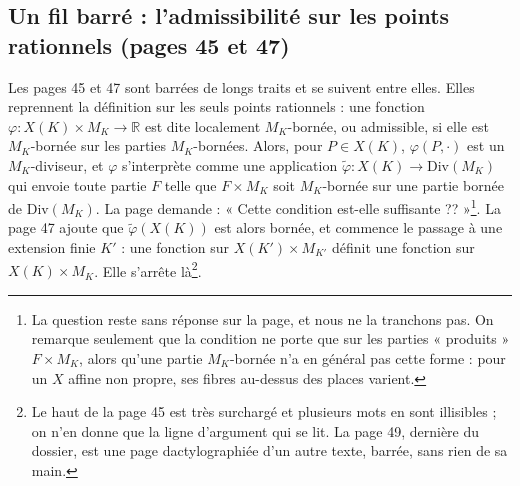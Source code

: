 \documentclass[11pt,a4paper]{article}
\begin{document}
\subsection*{Un fil barré : l'admissibilité sur les points rationnels (pages 45 et 47)}

Les pages 45 et 47 sont barrées de longs traits et se suivent entre elles.
Elles reprennent la définition sur les seuls points rationnels : une
fonction $\varphi : X(K) \times M_K \to \mathbb{R}$ est dite localement
$M_K$-bornée, ou admissible, si elle est $M_K$-bornée sur les parties
$M_K$-bornées. Alors, pour $P \in X(K)$, $\varphi(P, \cdot)$ est un
$M_K$-diviseur, et $\varphi$ s'interprète comme une application
$\tilde\varphi : X(K) \to \mathrm{Div}(M_K)$ qui envoie toute partie
$F$ telle que $F \times M_K$ soit $M_K$-bornée sur une partie bornée de
$\mathrm{Div}(M_K)$. La page demande : « Cette condition est-elle
suffisante ?? »\footnote{La question reste sans réponse sur la page, et nous
ne la tranchons pas. On remarque seulement que la condition ne porte que
sur les parties « produits » $F \times M_K$, alors qu'une partie
$M_K$-bornée n'a en général pas cette forme : pour un $X$ affine non
propre, ses fibres au-dessus des places varient.}. La page 47 ajoute que
$\tilde\varphi(X(K))$ est alors bornée, et commence le passage à une
extension finie $K'$ : une fonction sur $X(K') \times M_{K'}$ définit une
fonction sur $X(K) \times M_K$. Elle s'arrête là\footnote{Le haut de la page
45 est très surchargé et plusieurs mots en sont illisibles ; on n'en donne
que la ligne d'argument qui se lit. La page 49, dernière du dossier, est une
page dactylographiée d'un autre texte, barrée, sans rien de sa main.}.
\end{document}
